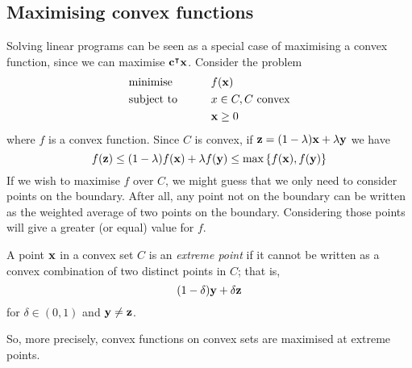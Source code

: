 \subsection{Maximising convex functions}
Solving linear programs can be seen as a special case of maximising a convex function, since we can maximise \( \vb c^\intercal \vb x \).
Consider the problem
\begin{alignat*}{2}
	 & \text{minimise}   & \qquad & f(\vb x)                  \\
	 & \text{subject to} &        & x \in C, C \text{ convex} \\
	 &                   &        & \vb x \geq 0
\end{alignat*}
where \( f \) is a convex function.
Since \( C \) is convex, if \( \vb z = (1 - \lambda) \vb x + \lambda\vb y \) we have
\[
	f(\vb z) \leq (1 - \lambda) f(\vb x) + \lambda f(\vb y) \leq \max\qty{f(\vb x), f(\vb y)}
\]
If we wish to maximise \( f \) over \( C \), we might guess that we only need to consider points on the boundary.
After all, any point not on the boundary can be written as the weighted average of two points on the boundary.
Considering those points will give a greater (or equal) value for \( f \).
\begin{definition}
	A point \( \vb x \) in a convex set \( C \) is an \textit{extreme point} if it cannot be written as a convex combination of two distinct points in \( C \); that is,
	\[
		(1 - \delta) \vb y + \delta \vb z
	\]
	for \( \delta \in (0, 1) \) and \( \vb y \neq \vb z \).
\end{definition}
So, more precisely, convex functions on convex sets are maximised at extreme points.

